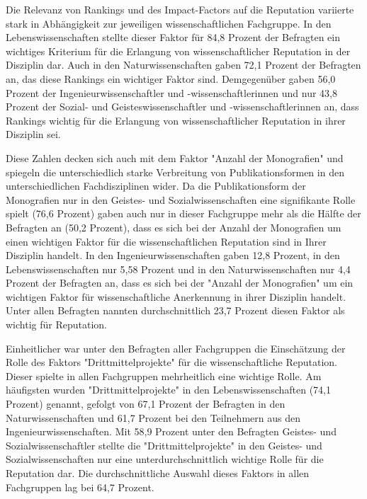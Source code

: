 Die Relevanz von Rankings und des Impact-Factors auf die Reputation variierte stark in Abhängigkeit zur jeweiligen wissenschaftlichen Fachgruppe. In den Lebenswissenschaften stellte dieser Faktor für 84,8 Prozent der Befragten ein wichtiges Kriterium für die Erlangung von wissenschaftlicher Reputation in der Disziplin dar. Auch in den Naturwissenschaften gaben 72,1 Prozent der Befragten an, das diese Rankings ein wichtiger Faktor sind. Demgegenüber gaben 56,0 Prozent der Ingenieurwissenschaftler und -wissenschaftlerinnen und nur 43,8 Prozent der Sozial- und Geisteswissenschaftler und -wissenschaftlerinnen an, dass Rankings wichtig für die Erlangung von wissenschaftlicher Reputation in ihrer Disziplin sei.

Diese Zahlen decken sich auch mit dem Faktor "Anzahl der Monografien" und spiegeln die unterschiedlich starke Verbreitung von Publikationsformen in den unterschiedlichen Fachdisziplinen wider. Da die Publikationsform der Monografien nur in den Geistes- und Sozialwissenschaften eine signifikante Rolle spielt (76,6 Prozent) gaben auch nur in dieser Fachgruppe mehr als die Hälfte der Befragten an (50,2 Prozent), dass es sich bei der Anzahl der Monografien um einen wichtigen Faktor für die wissenschaftlichen Reputation sind in Ihrer Disziplin handelt. In den Ingenieurwissenschaften gaben 12,8 Prozent, in den Lebenswissenschaften nur 5,58 Prozent und in den Naturwissenschaften nur 4,4 Prozent der Befragten an, dass es sich bei der "Anzahl der Monografien" um ein wichtigen Faktor für wissenschaftliche Anerkennung in ihrer Disziplin handelt. Unter allen Befragten nannten durchschnittlich 23,7 Prozent diesen Faktor als wichtig für Reputation.

Einheitlicher war unter den Befragten aller Fachgruppen die Einschätzung der Rolle des Faktors "Drittmittelprojekte" für die wissenschaftliche Reputation. Dieser spielte in allen Fachgruppen mehrheitlich eine wichtige Rolle. Am häufigsten wurden "Drittmittelprojekte" in den Lebenswissenschaften (74,1 Prozent) genannt, gefolgt von 67,1 Prozent der Befragten in den Naturwissenschaften und 61,7 Prozent bei den Teilnehmern aus den Ingenieurwissenschaften. Mit 58,9 Prozent unter den Befragten Geistes- und Sozialwissenschaftler stellte die "Drittmittelprojekte" in den Geistes- und Sozialwissenschaften nur eine unterdurchschnittlich wichtige Rolle für die Reputation dar. Die durchschnittliche Auswahl dieses Faktors in allen Fachgruppen lag bei 64,7 Prozent.

